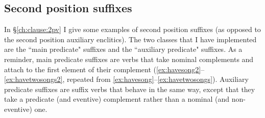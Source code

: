 \begin{comment}
That is, the attribute-value matrix (AVM) for the full predicate complex \textit{=ʔaqƛ=s} in (\ref{ex:2padvpred}) should look something like this:

\ex \label{ex:2pmodavm}
\begin{avm}
\[\asort{clausal-inflection}
   head.pred & + \\
   comp & \< \[ \textsc{head} & +mod \\
 	               mod & \< \[ head.pred & + \\
 	                                    subj & 1sg \\
 	                                    e.tense & future \] \> \] \> \]
\end{avm}
\xe




\ex \label{ex:2pmodrule}
\begin{avm}
\[\asort{clausal-inflection-mod}
 \textsc{head.pred} & + \\
   subj & \avmbox{1} \\
   \textsc{comp} & \< \[ \textsc{head} & +mod \\
 	               \textsc{mod} & \< \[ \textsc{head.pred} & + \\
 	                                    \textsc{subj} & \avmbox{1} \\
 	                                    \textsc{comp} & \avmbox{2} \] \> \] \> $\oplus$ \avmbox{2} \\
   \textsc{dtr} & \textit{clausal-inflection} \]
\end{avm}
\xe
\end{comment}

\subsection{Second position suffixes} \label{ch:clause:analysis:2pv}

In \S\ref{ch:clause:2pv} I give some examples of second position suffixes (as opposed to the second position auxiliary enclitics). The two classes that I have implemented are the ``main predicate" suffixes and the ``auxiliary predicate" suffixes. As a reminder, main predicate suffixes are verbs that take nominal complements and attach to the first element of their complement (\ref{ex:havesong2}--\ref{ex:havetwosongs2}, repeated from \ref{ex:havesong}--\ref{ex:havetwosongs}). Auxiliary predicate suffixes are suffix verbs that behave in the same way, except that they take a predicate (and eventive) complement rather than a nominal (and non-eventive) one.

